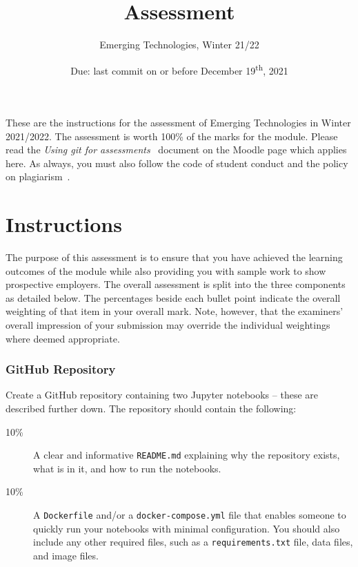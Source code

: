 \documentclass[a4paper, 12pt]{scrartcl}
\title{\vspace{-20mm}Assessment}
\author{Emerging Technologies, Winter 21/22}
\date{Due: last commit on or before December 19\textsuperscript{th}, 2021\vspace{-6mm}}
\begin{document}
  
  \maketitle

  These are the instructions for the assessment of Emerging Technologies in Winter 2021/2022.
  The assessment is worth 100\% of the marks for the module.
  Please read the \emph{Using git for assessments}~\cite{usinggit} document on the Moodle page which applies here.
  As always, you must also follow the code of student conduct and the policy on plagiarism~\cite{gmitqaf}.

  \section*{Instructions}
  
  The purpose of this assessment is to ensure that you have achieved the learning outcomes of the module while also providing you with sample work to show prospective employers.
  The overall assessment is split into the three components as detailed below.
  The percentages beside each bullet point indicate the overall weighting of that item in your overall mark.
  Note, however, that the examiners' overall impression of your submission may override the individual weightings where deemed appropriate.

  \subsubsection*{GitHub Repository}
  Create a GitHub repository containing two Jupyter notebooks -- these are described further down.
  The repository should contain the following:
  \begin{description}
    \item[10\%] A clear and informative \texttt{README.md} explaining why the repository exists, what is in it, and how to run the notebooks.
    \item[10\%] A \texttt{Dockerfile} and/or a \texttt{docker-compose.yml} file that enables someone to quickly run your notebooks with minimal configuration. You should also include any other required files, such as a \texttt{requirements.txt} file, data files, and image files.
  \end{description}
\end{document}

